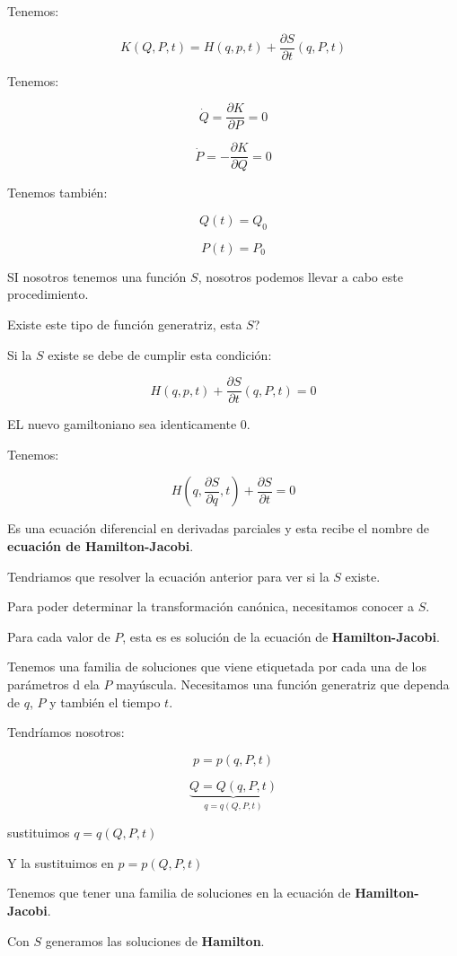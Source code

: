 \documentclass{article}
\begin{document}
Tenemos:


\[ K(Q,P,t) = H(q,p,t) + \frac{\partial S}{\partial t}(q,P,t) \]



Tenemos:


\[ \dot{Q} = \frac{\partial K}{\partial P} =0 \]


\[  \dot{P} = - \frac{\partial K}{\partial Q} =0  \]


Tenemos también:

\[ Q(t) = Q_{0} \]

\[ P(t) = P_{0} \]

SI nosotros tenemos una función $S$, nosotros podemos llevar a cabo este procedimiento. 

Existe este tipo de función generatriz, esta $S$?

Si la $S$ existe se debe de cumplir esta condición: 


\[ H(q,p,t) + \frac{\partial S}{\partial t} (q,P,t) =0 \]


EL nuevo gamiltoniano sea identicamente $0$. 

Tenemos:


\[ H\left( q, \frac{\partial S}{\partial q}, t  \right) + \frac{\partial S}{\partial t} =0 \]


Es una ecuación diferencial en derivadas parciales y esta recibe el nombre de \textbf{ecuación de Hamilton-Jacobi}.


Tendriamos que resolver la ecuación anterior para ver si la $S$ existe. 


Para poder determinar la transformación canónica, necesitamos conocer a $S$.


Para cada valor de $P$, esta es es solución de la ecuación de \textbf{Hamilton-Jacobi}.

Tenemos una familia de soluciones que viene etiquetada por cada una de los parámetros d ela $P$ mayúscula. Necesitamos una función generatriz que dependa de $q$, $P$ y también el tiempo $t$.


Tendríamos nosotros:


\[ p = p(q,P,t) \]


\[\underbrace{Q = Q(q,P,t)}_{q=q(Q,P,t)} \]

sustituimos $q = q(Q,P,t)$

Y la sustituimos en $p=p(Q,P,t)$


Tenemos que tener una familia de soluciones en la ecuación de \textbf{Hamilton-Jacobi}.

Con $S$ generamos las soluciones de \textbf{Hamilton}. 
\end{document}
